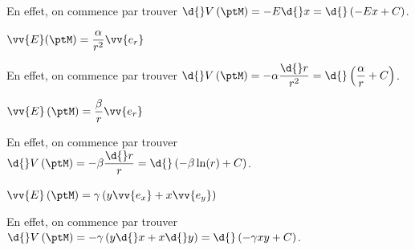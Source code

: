 
\begin{corrige}
En effet, on commence par trouver $\d{}V\left(\ptM\right)=-E\d{}x=\d{}\left(-Ex+C\right)$.
\end{corrige}



\begin{enonce}
$\vv{E}(\ptM)=\dfrac{\alpha}{r^{2}}\vv{e_{r}}$
\end{enonce}
%
\begin{corrige}
En effet, on commence par trouver $\d{}V\left(\ptM\right)=-\alpha\dfrac{\d{}r}{r^{2}}=\d{}\left(\dfrac{\alpha}{r}+C\right)$.
\end{corrige}



\begin{enonce}
$\vv{E}\left(\ptM\right)=\dfrac{\beta}{r}\vv{e_{r}}$
\end{enonce}


\begin{corrige}
En effet, on commence par trouver $\d{}V\left(\ptM\right)=-\beta\dfrac{\d{}r}{r}=\d{}\left(-\beta\ln(r)+C\right)$.
\end{corrige}



\begin{enonce}
$\vv{E}\left(\ptM\right)=\gamma\left(y\vv{e_{x}}+x\vv{e_{y}}\right)$
\end{enonce}


\begin{corrige}
En effet, on commence par trouver $\d{}V\left(\ptM\right)=-\gamma\left(y\d{}x+x\d{}y\right)=\d{}\left(-\gamma xy+C\right)$.
\end{corrige}

